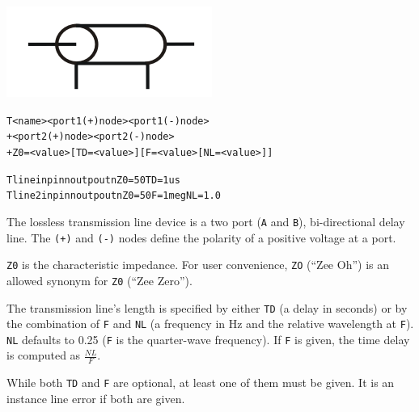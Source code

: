 


\begin{Device}\label{T_DEVICE}

\symbol
{\includegraphics{translineSymbol}}

\device
\begin{alltt}
T<name> <port 1 (+) node> <port 1 (-) node>
+ <port 2 (+) node> <port 2 (-) node>
+ Z0=<value> [TD=<value>] [F=<value> [NL=<value>]]
\end{alltt}

\examples
\begin{alltt}
Tline inp inn outp outn Z0=50 TD=1us
Tline2 inp inn outp outn Z0=50 F=1meg NL=1.0
\end{alltt}

\comments

The lossless transmission line device is a two port (\texttt{A} and
\texttt{B}), bi-directional delay line. The \texttt{(+)} and
\texttt{(-)} nodes define the polarity of a positive voltage at a port.

\texttt{Z0} is the characteristic impedance. For user convenience, 
\texttt{ZO} (``Zee Oh'') is an allowed synonym for \texttt{Z0} (``Zee Zero'').

The transmission line's length is specified by either \texttt{TD} (a delay in
seconds) or by the combination of \texttt{F} and \texttt{NL} (a frequency in Hz and 
the relative wavelength at \texttt{F}). \texttt{NL} defaults to 0.25 (\texttt{F} is 
the quarter-wave frequency).  If \texttt{F} is given, the time delay is 
computed as $\frac{NL}{F}$.  

While both \texttt{TD} and \texttt{F} are optional, at least one of them must be given.
It is an instance line error if both are given.


\end{Device}
